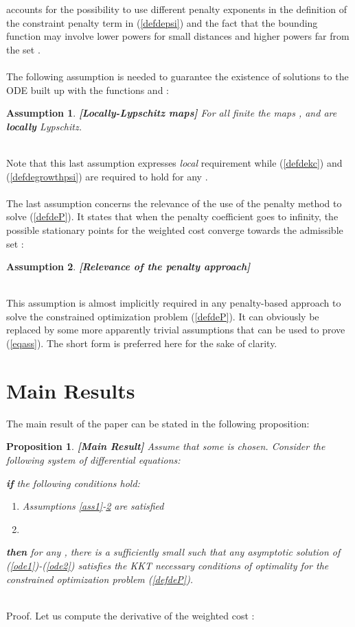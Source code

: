 \documentclass{article}
\newtheorem{assumption}{\bf Assumption}
\newtheorem{proposition}{\bf Proposition}
\begin{document}
accounts for the possibility to use different penalty exponents  in the definition of the constraint penalty term in (\ref{defdepsi}) and the fact that the bounding function may involve lower powers for small distances  and higher powers far from the set . \ \\ \ \\ 
The following assumption is needed to guarantee the existence of solutions to the ODE built up with the functions  and :\\
\begin{assumption}{\bf [Locally-Lypschitz maps]} \label{ass4} 
For all finite  the maps ,  and  are {\bf locally} Lypschitz.
\end{assumption}
\ \\
Note that this last assumption expresses {\em local} requirement while (\ref{defdekc}) and (\ref{defdegrowthpsi}) are required to hold for any .\ \\ \ \\ 
The last assumption concerns the relevance of the use of the penalty method to solve (\ref{defdeP}). It states that when the penalty coefficient  goes to infinity, the  possible stationary points for the weighted cost converge towards the admissible set :\\
\begin{assumption}{\bf [Relevance of the penalty approach]}\label{ass5} 
 
\end{assumption}
\ \\ 
This assumption is almost implicitly required in any penalty-based approach to solve the constrained optimization problem (\ref{defdeP}). It can obviously be replaced by some more apparently trivial assumptions that can be used to prove (\ref{eqass}). The short form is preferred here for the sake of clarity.  
\section{Main Results} \label{secmainresult}
The main result of the paper can be stated in the following proposition:\\
\begin{proposition}{\bf [Main Result]} \label{prop1} 
Assume that some  is chosen. Consider the following system of differential equations:
 
{\bf if} the following conditions hold:
\begin{enumerate}
\item Assumptions \ref{ass1}-\ref{ass5} are satisfied
\item  [see (\ref{defdePol})]
\end{enumerate}
{\bf then} for any , there is a sufficiently small  such that any asymptotic solution of (\ref{ode1})-(\ref{ode2}) satisfies the KKT necessary conditions of optimality for the constrained optimization problem (\ref{defdeP}). 
\end{proposition}
\ \\
{\sc Proof}. Let us compute the derivative of the weighted cost :
 
\end{document}
